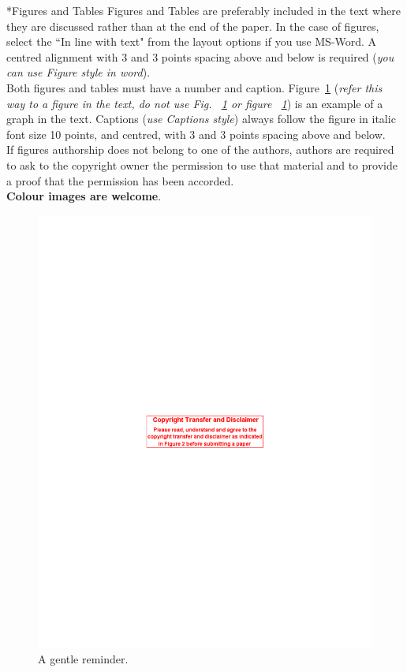 \documentclass[twocolumn, a4paper,10pt]{article}
\makeatletter
\renewcommand\subsection{\@startsection{subsection}{1}{\z@}{\z@}{\z@}{\normalfont\normalsize\bfseries}}
\renewcommand\subsection{\@startsection{subsection}{1}{\z@}{\z@}{0.1pt}{\normalfont\normalsize\bfseries}}
\makeatother
\begin{document}
\subsection*{Figures and Tables}
Figures and Tables are preferably included in the text where they are discussed rather than at the end of the paper. In the case of figures, select the ``In line with text" from the layout options if you use MS-Word. A centred alignment with 3 and 3 points spacing above and below is required (\textit{you can use Figure style in word}). \\
Both figures and tables must have a number and caption. Figure~\ref{fig:fig01} (\textit{refer this way to a figure in the text, do not use Fig. ~\ref{fig:fig01} or figure ~\ref{fig:fig01}}) is an example of a graph in the text. Captions (\textit{use Captions style}) always follow the figure in italic font size 10 points, and centred, with 3 and 3 points spacing above and below.\\
If figures authorship does not belong to one of the authors, authors are required to ask to the copyright owner the permission to use that material and to provide a proof that the permission has been accorded.\\
\textbf{Colour images are welcome}.\\
\begin{figure}
\centering
\includegraphics[scale=1.0]{img/fig1.pdf}
\caption{A gentle reminder.}
\label{fig:fig01}
\vspace{-16pt}   %
\end{figure}
\end{document}
